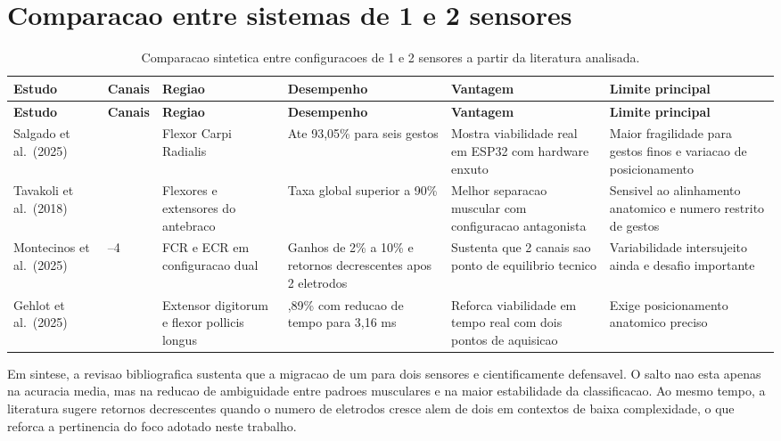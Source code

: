 \documentclass[12pt,oneside,a4paper,english,brazilian]{abntex2}
\begin{document}
\section{Comparacao entre sistemas de 1 e 2 sensores}

\small
\setlength{\tabcolsep}{4pt}
\begin{longtable}{@{}>{\RaggedRight\arraybackslash}p{}>{\RaggedRight\arraybackslash}p{}>{\RaggedRight\arraybackslash}p{}>{\RaggedRight\arraybackslash}p{}>{\RaggedRight\arraybackslash}p{}>{\RaggedRight\arraybackslash}p{}@{}}
\caption{Comparacao sintetica entre configuracoes de 1 e 2 sensores a partir da literatura analisada.}\label{tab:comparacao}\\
\toprule
\textbf{Estudo} & \textbf{Canais} & \textbf{Regiao} & \textbf{Desempenho} & \textbf{Vantagem} & \textbf{Limite principal} \\
\midrule
\endfirsthead

\toprule
\textbf{Estudo} & \textbf{Canais} & \textbf{Regiao} & \textbf{Desempenho} & \textbf{Vantagem} & \textbf{Limite principal} \\
\midrule
\endhead

\midrule
\endfoot

\bottomrule
\endlastfoot

Salgado et al.\ (2025) & 1 & Flexor Carpi Radialis & Ate 93,05\% para seis gestos & Mostra viabilidade real em ESP32 com hardware enxuto & Maior fragilidade para gestos finos e variacao de posicionamento \\
\midrule
Tavakoli et al.\ (2018) & 2 & Flexores e extensores do antebraco & Taxa global superior a 90\% & Melhor separacao muscular com configuracao antagonista & Sensivel ao alinhamento anatomico e numero restrito de gestos \\
\midrule
Montecinos et al.\ (2025) & 1--4 & FCR e ECR em configuracao dual & Ganhos de 2\% a 10\% e retornos decrescentes apos 2 eletrodos & Sustenta que 2 canais sao ponto de equilibrio tecnico & Variabilidade intersujeito ainda e desafio importante \\
\midrule
Gehlot et al.\ (2025) & 2 & Extensor digitorum e flexor pollicis longus & 87,89\% com reducao de tempo para 3,16 ms & Reforca viabilidade em tempo real com dois pontos de aquisicao & Exige posicionamento anatomico preciso \\
\end{longtable}
\normalsize

Em sintese, a revisao bibliografica sustenta que a migracao de um para dois sensores e cientificamente defensavel. O salto nao esta apenas na acuracia media, mas na reducao de ambiguidade entre padroes musculares e na maior estabilidade da classificacao. Ao mesmo tempo, a literatura sugere retornos decrescentes quando o numero de eletrodos cresce alem de dois em contextos de baixa complexidade, o que reforca a pertinencia do foco adotado neste trabalho.
\end{document}
